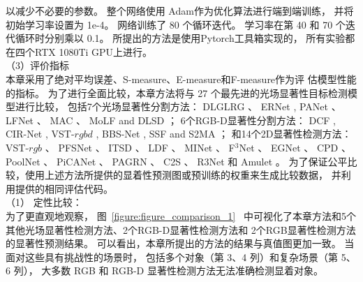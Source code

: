 以减少不必要的参数。 
整个网络使用 Adam作为优化算法进行端到端训练，
并将初始学习率设置为 1e-4。 
网络训练了 80 个循环迭代。 学习率在第 40 和 70 个迭代循环时分别乘以 0.1。 
所提出的方法是使用Pytorch工具箱实现的，
所有实验都在四个RTX 1080Ti GPU上进行。 
\\
%
%
%
%
\indent
（3）评价指标
\\
%
%
%
%
\indent
本章采用了绝对平均误差、S-measure、E-measure和F-measure作为评
估模型性能的指标。
%
%
%
%
为了进行全面比较，本章方法将与 27 个最先进的光场显著性目标检测模型进行比较，
包括7个光场显著性分割方法：
DLGLRG 、
ERNet ,
PANet 、
LFNet 、
MAC 、 MoLF  and DLSD ；
%
%
%
%
6个RGB-D显著性分割方法：
DCF , CIR-Net , VST-$rgbd$  ,
BBS-Net     , SSF      and S2MA    ；
%
%
%
%
%
和14个2D显著性检测方法：
VST-$rgb$ 、
PFSNet 、
ITSD 、
LDF 、
MINet 、
F$^{3}$Net  、 
EGNet   、
CPD  、
PoolNet 、
PiCANet 、
PAGRN 、
C2S   、
R3Net  
和
Amulet 。
为了保证公平比较，使用上述方法所提供的显着性预测图或预训练的权重来生成比较数据，
并利用提供的相同评估代码。
\\
%
%
%
%
\indent
（1）
定性比较：
\\
%
%
%
%
\indent
为了更直观地观察，
图~\ref{figure:figure_comparison_1}~
中可视化了本章方法和5个其他光场显著性检测方法、2个RGB-D显著性检测方法和
2个RGB显著性检测方法的显著性预测结果。
可以看出，本章所提出的方法的结果与真值图更加一致。 
当面对这些具有挑战性的场景时，
包括多个对象（第 3、4 列）和复杂场景（第 5、6 列），
大多数 RGB 和 RGB-D 显著性检测方法无法准确检测显着对象。
